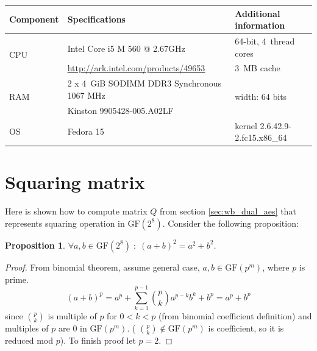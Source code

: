 \documentclass[11pt,oneside,final]{fithesis2}
\newtheorem{myprop}{Proposition}
\newcommand{\gfe}{\ensuremath{\text{GF}\left(2^8\right)}}
\begin{document}
    \begin{center}
    \begin{table}[ht]
    \begin{tabular}{ l | l | l }
	\hline
	Component & Specifications & Additional information \\
	\hline
	\hline
	\multirow{2}{*}{CPU} & Intel\textsuperscript{\textregistered} Core\textsuperscript{\texttrademark} i5 M 560 @ 2.67GHz & 64-bit, 4~thread cores  \\
	                     & \url{http://ark.intel.com/products/49653}                                                      & 3~MB cache              \\ \hline
	\multirow{2}{*}{RAM} & 2 x 4~GiB SODIMM DDR3 Synchronous 1067 MHz                                                     & \multirow{2}{*}{width: 64 bits}    \\
	                     & Kinston 9905428-005.A02LF                                                                      &    \\ \hline
	OS		     & Fedora 15										      & kernel 2.6.42.9-2.fc15.x86\_64 \\ \hline 
    \end{tabular}
    \end{table}
    \end{center}
    
    \section{Squaring matrix}\label{appendix:sqr_matrix}
    Here is shown how to compute matrix $Q$ from section \ref{sec:wb_dual_aes} that represents squaring operation in $\gfe$. Consider the following proposition:
    
    \begin{myprop}\label{prop:squaring_is_linear}
     $\forall a,b \in \gfe \; : \; \left(a + b\right)^2 = a^2 + b^2$. 
    \end{myprop}
    \begin{proof}
    From binomial theorem, assume general case, $a,b \in \text{GF}(p^m)$, where $p$ is prime.
    \begin{equation*}
     (a+b)^p = a^p + \sum_{k=1}^{p-1} \binom{p}{k} a^{p-k}b^{k} + b^p = a^p + b^p
    \end{equation*}
    since $\binom{p}{k}$ is multiple of $p$ for $0 < k < p$ (from binomial coefficient definition) and multiples of $p$ are $0$ in $\text{GF}(p^m)$. (
    $\binom{p}{k} \notin \text{GF}(p^m)$ is coefficient, so it is reduced mod $p$). To finish proof let $p=2$.
    \end{proof}
\end{document}
